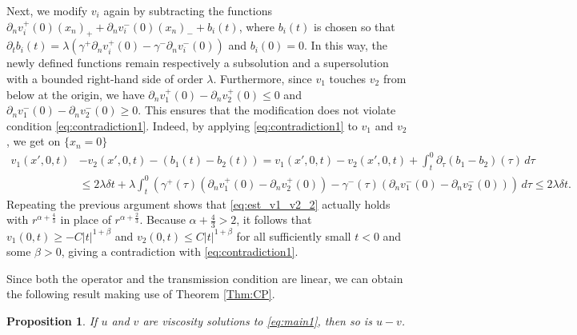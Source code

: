 \documentclass[12pt]{article}
\makeatletter
\newenvironment{customproof}[1]{%
  \par\pushQED{\qed}%
  \normalfont\topsep6pt \trivlist
  \item[\hskip\labelsep\itshape
    Proof of #1\@addpunct{.}]\ignorespaces
}{%
  \popQED\endtrivlist\@endpefalse
}
\numberwithin{Theorem}{section}
\newtheorem{Proposition}[Theorem]{Proposition}
\theoremstyle{definition}
\theoremstyle{remark}
\numberwithin{equation}{section}
\newcommand{\p}{\partial}
\makeatother
\begin{document}
\begin{customproof}{Theorem \ref{Thm:CP}}
Next, we modify $v_i$ again by subtracting the functions $\p_n  v_i^+ (0) (x_n)_+ + \p_n  v_i^- (0) (x_n)_- + b_i(t)$, where $b_i(t)$ is chosen so that $\p_t b_i(t)=  \lambda \left(\gamma^+ \p_n v_i^+ (0) - \gamma^{-} \p_n  v_i^-(0) \right)$ and $b_i(0)=0$. In this way, the newly defined functions remain respectively a subsolution and a supersolution with a bounded right-hand side of order $\lambda$. 
Furthermore, since $v_1$ touches $v_2$ from below at the origin, we have $\p_n v_1^+(0) - \p_n v_2^+(0) \leq 0$ and $\p_n v_1^-(0) - \p_n v_2^-(0) \geq 0$. This ensures that the modification does not violate condition \eqref{eq:contradiction1}. Indeed, by applying \eqref{eq:contradiction1} to $v_1$ and $v_2$, we get on $\{x_n = 0\}$
\begin{align*}
    v_1(x',0,t) &- v_2(x',0,t) - (b_1(t) - b_2(t)) = v_1(x',0,t) - v_2(x',0,t) + \int_{t}^{0} \p_\tau ( b_1 -b_2)(\tau) \, d\tau \\
    &\leq 2\lambda \delta t +\lambda \int_{t}^{0} \left( \gamma^+(\tau) (\p_n v_1^+(0) - \p_n v_2^+(0)) -\gamma^{-}(\tau) (\p_n v_1^-(0) - \p_n v_2^-(0))\right) \, d\tau \leq 2\lambda\delta t. 
\end{align*}
Repeating the previous argument shows that \eqref{eq:est_v1_v2_2} actually holds with $r^{{ \alpha}+\frac{4}{3}}$ in place of $r^{{ \alpha}+\frac{2}{3}}$. Because ${ \alpha} + \frac{4}{3}>2$, it follows that $v_1(0,t)\geq -C|t|^{1+\beta}$ and $v_2(0,t)\leq C|t|^{1+\beta}$ for all sufficiently small $t<0$ and some $\beta>0$, giving a contradiction with \eqref{eq:contradiction1}.
\end{customproof}

Since both the operator and the transmission condition are linear, we can obtain the following result making use of Theorem \ref{Thm:CP}.

\begin{Proposition} \label{prop:diff_sol}
        If $u$ and $v$ are viscosity solutions to \eqref{eq:main1}, then so is $u-v$.
\end{Proposition}
\end{document}
